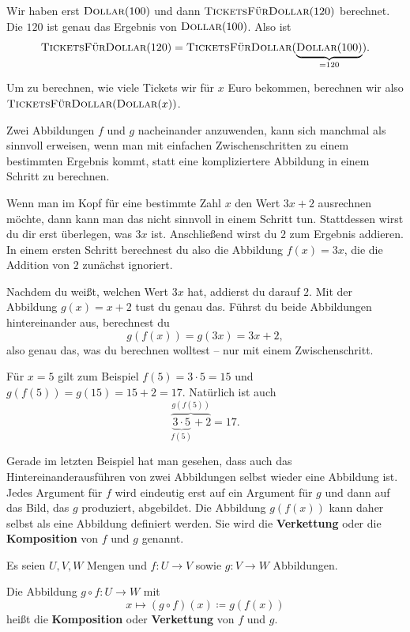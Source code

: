 \documentclass[../../main.tex]{subfiles}
\begin{document}
\begin{example}
    Wir haben erst $\textsc{Dollar}(100)$ und dann $\textsc{TicketsFürDollar}(120)$ berechnet. Die $120$ ist genau das Ergebnis von $\textsc{Dollar}(100)$. Also ist \[\textsc{TicketsFürDollar}(120)=\textsc{TicketsFürDollar}(\underbrace{\textsc{Dollar}(100)}_{=120}).\]
    
    Um zu berechnen, wie viele Tickets wir für $x$ Euro bekommen, berechnen wir also $\textsc{TicketsFürDollar}(\textsc{Dollar}(x))$.
\end{example}

Zwei Abbildungen $f$ und $g$ nacheinander anzuwenden, kann sich manchmal als sinnvoll erweisen, wenn man mit einfachen Zwischenschritten zu einem bestimmten Ergebnis kommt, statt eine kompliziertere Abbildung in einem Schritt zu berechnen.

\begin{example}
    Wenn man im Kopf für eine bestimmte Zahl $x$ den Wert $3x+2$ ausrechnen möchte, dann kann man das nicht sinnvoll in einem Schritt tun. Stattdessen wirst du dir erst überlegen, was $3x$ ist. Anschließend wirst du $2$ zum Ergebnis addieren. In einem ersten Schritt berechnest du also die Abbildung $f(x)=3x$, die die Addition von $2$ zunächst ignoriert.
    
    Nachdem du weißt, welchen Wert $3x$ hat, addierst du darauf $2$. Mit der Abbildung $g(x)=x+2$ tust du genau das. Führst du beide Abbildungen hintereinander aus, berechnest du \[g(f(x))=g(3x)=3x+2,\] also genau das, was du berechnen wolltest -- nur mit einem Zwischenschritt.
    
    Für $x=5$ gilt zum Beispiel $f(5)=3\cdot 5=15$ und $g(f(5))=g(15)=15+2=17$. Natürlich ist auch \[\overbrace{\underbrace{3\cdot 5}_{f(5)}+2}^{g(f(5))}=17.\]
\end{example}

Gerade im letzten Beispiel hat man gesehen, dass auch das Hintereinanderausführen von zwei Abbildungen selbst wieder eine Abbildung ist. Jedes Argument für $f$ wird eindeutig erst auf ein Argument für $g$ und dann auf das Bild, das $g$ produziert, abgebildet. Die Abbildung $g(f(x))$ kann daher selbst als eine Abbildung definiert werden. Sie wird die \textbf{Verkettung} oder die \textbf{Komposition} von $f$ und $g$ genannt.

\begin{definition}
    Es seien $U,V,W$ Mengen und $f\colon U\rightarrow V$ sowie $g\colon V\rightarrow W$ Abbildungen.
    
    Die Abbildung $g\circ f\colon U\rightarrow W$ mit \[x\mapsto (g\circ f)(x)\coloneqq g(f(x))\] heißt die \textbf{Komposition} oder \textbf{Verkettung} von $f$ und $g$.
\end{definition}
\end{document}
